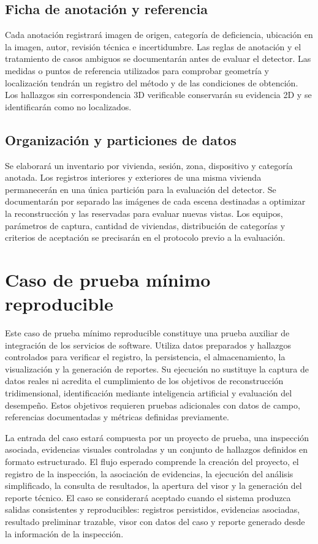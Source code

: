 \documentclass[12pt,oneside]{report}
\begin{document}
\section{Ficha de anotación y referencia}
Cada anotación registrará imagen de origen, categoría de deficiencia, ubicación en la imagen, autor, revisión técnica e incertidumbre. Las reglas de anotación y el tratamiento de casos ambiguos se documentarán antes de evaluar el detector. Las medidas o puntos de referencia utilizados para comprobar geometría y localización tendrán un registro del método y de las condiciones de obtención. Los hallazgos sin correspondencia 3D verificable conservarán su evidencia 2D y se identificarán como no localizados.

\section{Organización y particiones de datos}
Se elaborará un inventario por vivienda, sesión, zona, dispositivo y categoría anotada. Los registros interiores y exteriores de una misma vivienda permanecerán en una única partición para la evaluación del detector. Se documentarán por separado las imágenes de cada escena destinadas a optimizar la reconstrucción y las reservadas para evaluar nuevas vistas. Los equipos, parámetros de captura, cantidad de viviendas, distribución de categorías y criterios de aceptación se precisarán en el protocolo previo a la evaluación.

\chapter{Caso de prueba mínimo reproducible}

Este caso de prueba mínimo reproducible constituye una prueba auxiliar de integración de los servicios de software. Utiliza datos preparados y hallazgos controlados para verificar el registro, la persistencia, el almacenamiento, la visualización y la generación de reportes. Su ejecución no sustituye la captura de datos reales ni acredita el cumplimiento de los objetivos de reconstrucción tridimensional, identificación mediante inteligencia artificial y evaluación del desempeño. Estos objetivos requieren pruebas adicionales con datos de campo, referencias documentadas y métricas definidas previamente.\par

La entrada del caso estará compuesta por un proyecto de prueba, una inspección asociada, evidencias visuales controladas y un conjunto de hallazgos definidos en formato estructurado. El flujo esperado comprende la creación del proyecto, el registro de la inspección, la asociación de evidencias, la ejecución del análisis simplificado, la consulta de resultados, la apertura del visor y la generación del reporte técnico. El caso se considerará aceptado cuando el sistema produzca salidas consistentes y reproducibles: registros persistidos, evidencias asociadas, resultado preliminar trazable, visor con datos del caso y reporte generado desde la información de la inspección.\par
\end{document}
